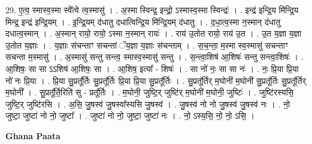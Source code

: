 \documentclass[17pt]{extarticle}
\begin{document}
29. ए॒त्व॒ स्मास्व॒स्मा स्वे᳚त्वे त्व॒स्मासु॑ । . अ॒स्मा स्विन्द्र॒ इन्द्रो॒ ऽस्मास्व॒स्मा स्विन्द्रः॑ । . इन्द्र॑ इन्द्रि॒य मि॑न्द्रि॒य मिन्द्र॒ इन्द्र॑ इन्द्रि॒यम् । . इ॒न्द्रि॒यम् द॑धातु दधात्विन्द्रि॒य मि॑न्द्रि॒यम् द॑धातु । . द॒धा॒त्व॒स्मा न॒स्मान् द॑धातु दधात्व॒स्मान् । . अ॒स्मान् रायो॒ रायो॒ ऽस्मा न॒स्मान् रायः॑ । . राय॑ उ॒तोत रायो॒ राय॑ उ॒त । . उ॒त य॒ज्ञा य॒ज्ञा उ॒तोत य॒ज्ञाः । . य॒ज्ञाः स॑चन्ताꣳ सचन्तां ॅय॒ज्ञा य॒ज्ञाः स॑चन्ताम् । . स॒च॒न्ता॒ म॒स्मा स्व॒स्मासु॑ सचन्ताꣳ सचन्ता म॒स्मासु॑ । . अ॒स्मासु॑ सन्तु सन्त्व॒ स्मास्व॒स्मासु॑ सन्तु । . स॒न्त्वा॒शिष॑ आ॒शिषः॑ सन्तु सन्त्वा॒शिषः॑ । . आ॒शिषः॒ सा सा ऽऽशिष॑ आ॒शिषः॒ सा । . आ॒शिष॒ इत्या᳚ - शिषः॑ । . सा नो॑ नः॒ सा सा नः॑ । . नः॒ प्रि॒या प्रि॒या नो॑ नः प्रि॒या । . प्रि॒या सु॒प्रतू᳚र्तिः सु॒प्रतू᳚र्तिः प्रि॒या प्रि॒या सु॒प्रतू᳚र्तिः । . सु॒प्रतू᳚र्तिर् म॒घोनी॑ म॒घोनी॑ सु॒प्रतू᳚र्तिः सु॒प्रतू᳚र्तिर् म॒घोनी᳚ । . सु॒प्रतू᳚र्ति॒रिति॑ सु - प्रतू᳚र्तिः । . म॒घोनी॒ जुष्टि॒र् जुष्टि॑र् म॒घोनी॑ म॒घोनी॒ जुष्टिः॑ । . जुष्टि॑रस्यसि॒ जुष्टि॒र् जुष्टि॑रसि । . अ॒सि॒ जु॒षस्व॑ जु॒षस्वा᳚स्यसि जु॒षस्व॑ । . जु॒षस्व॑ नो नो जु॒षस्व॑ जु॒षस्व॑ नः । . नो॒ जुष्टा॒ जुष्टा॑ नो नो॒ जुष्टा᳚ । . जुष्टा॑ नो नो॒ जुष्टा॒ जुष्टा॑ नः । . नो॒ ऽस्य॒सि॒ नो॒ नो॒ ऽसि॒ । \newline

\textbf{Ghana Paata } \newline
\end{document}
